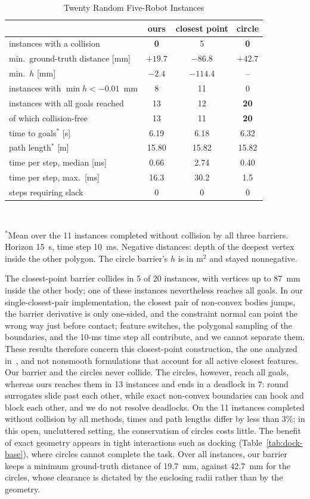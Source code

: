 \documentclass[journal]{IEEEtran}
\theoremstyle{definition}
\begin{document}
\begin{table}[t]
\caption{Twenty Random Five-Robot Instances}
\label{tab:stats}
\centering
\footnotesize
\setlength{\tabcolsep}{5pt}
\renewcommand{\arraystretch}{1.05}
\begin{tabular}{lccc}
\toprule
& ours & closest point & circle\\
\midrule
instances with a collision & \textbf{0} & 5 & \textbf{0}\\
min.\ ground-truth distance [mm] & $+19.7$ & $-86.8$ & $+42.7$\\
min.\ $h$ [mm] & $-2.4$ & $-114.4$ & --\\
instances with $\min h<-0.01$~mm & 8 & 11 & 0\\
instances with all goals reached & 13 & 12 & \textbf{20}\\
\quad of which collision-free & 13 & 11 & \textbf{20}\\
time to goals$^\ast$ [s] & 6.19 & 6.18 & 6.32\\
path length$^\ast$ [m] & 15.80 & 15.82 & 15.82\\
time per step, median [ms] & 0.66 & 2.74 & 0.40\\
time per step, max.\ [ms] & 16.3 & 30.2 & 1.5\\
steps requiring slack & 0 & 0 & 0\\
\bottomrule
\end{tabular}
\\[3pt]
\parbox{\columnwidth}{\footnotesize $^\ast$Mean over the 11 instances completed without collision by
all three barriers. Horizon 15~s, time step 10~ms. Negative distances: depth of the deepest vertex
inside the other polygon. The circle barrier's $h$ is in m$^2$ and stayed nonnegative.}
\end{table}

The closest-point barrier collides in 5 of 20 instances, with vertices up to 87~mm inside the other
body; one of these instances nevertheless reaches all goals. In our single-closest-pair
implementation, the closest pair of non-convex bodies jumps, the barrier derivative is only
one-sided, and the constraint normal can point the wrong way just before contact; feature switches,
the polygonal sampling of the boundaries, and the 10-ms time step all contribute, and we cannot
separate them. These results therefore concern this closest-point construction, the one analyzed
in~\cite{jo2026geometry}, and not nonsmooth formulations that account for all active closest
features. Our barrier and the circles never collide. The circles, however, reach all goals, whereas
ours reaches them in 13 instances and ends in a deadlock in 7: round surrogates slide past each
other, while exact non-convex boundaries can hook and block each other, and we do not resolve
deadlocks. On the 11 instances completed without collision by all methods, times and path lengths
differ by less than 3\%; in this open, uncluttered setting, the conservatism of circles costs little.
The benefit of exact geometry appears in tight interactions such as docking
(Table~\ref{tab:dock-base}), where circles cannot complete the task. Over all instances, our barrier
keeps a minimum ground-truth distance of 19.7~mm, against 42.7~mm for the circles, whose clearance is
dictated by the enclosing radii rather than by the geometry.
\end{document}
